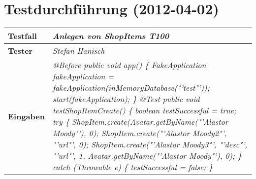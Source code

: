 
\chapter{Testdurchführung (2012-04-02)}



\begin{longtable}{|p{4cm}|p{11cm}|}
\hline
\textbf{Testfall} & \textit{Anlegen von ShopItems \textbf{T100}} \\
\hline
\textbf{Tester} & \textit{Stefan Hanisch} \\
\hline
\textbf{Eingaben} & \textit{@Before \newline
public void app() \{ \newline
\hspace*{1mm}FakeApplication fakeApplication \newline
\hspace*{4mm}= fakeApplication(inMemoryDatabase("'test"'));\newline
\hspace*{1mm}start(fakeApplication); \newline
\} \newline
\newline
@Test \newline
public void testShopItemCreate() \{\newline
\hspace*{1mm}boolean testSuccessful = true; \newline
\hspace*{1mm}try \{\newline
\hspace*{3mm}ShopItem.create(Avatar.getByName("'Alastor Moody"'), 0); \newline
\hspace*{3mm}ShopItem.create("'Alastor Moody2"', "'url"', 0); \newline
\hspace*{3mm}ShopItem.create("'Alastor Moody3"', "'desc"', "'url"', 1, \newline
\hspace*{6mm}Avatar.getByName("'Alastor Moody"'), 0); \newline
\hspace*{1mm}\} catch (Throwable e) \{ \newline
\hspace*{3mm}testSuccessful = false; \newline 
\hspace*{1mm}\} \newline
}
\end{longtable}

